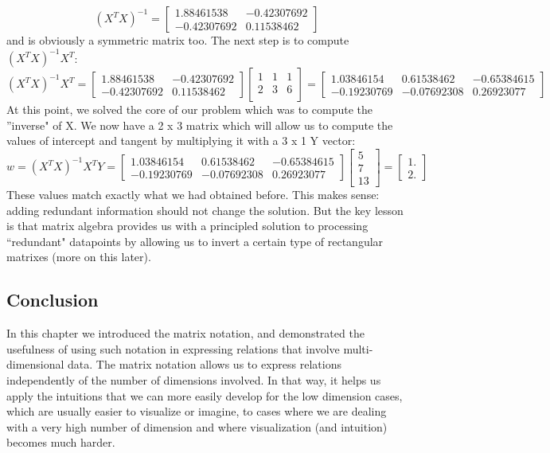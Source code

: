 \begin{equation}
(X^T X)^{-1}=
\begin{bmatrix}
1.88461538 & -0.42307692\\
-0.42307692 &  0.11538462
\end{bmatrix}
\end{equation}
and is obviously a symmetric matrix too. The next step is to compute $(X^T X)^{-1} X^T$:
\begin{equation}
(X^T X)^{-1} X^T=
\begin{bmatrix}
1.88461538 & -0.42307692\\
-0.42307692 &  0.11538462
\end{bmatrix}
\begin{bmatrix}
1& 1 &1\\
2& 3 &6\\
\end{bmatrix}=
\begin{bmatrix}
1.03846154 &  0.61538462 & -0.65384615\\
-0.19230769 & -0.07692308 &  0.26923077
\end{bmatrix}
\end{equation}
At this point, we solved the core of our problem which was to compute the ''inverse" of X. We now have a 2 x 3 matrix which will allow us to compute the values of intercept and tangent by multiplying it with a 3 x 1 Y vector:
\begin{equation}
w = (X^T X)^{-1} X^T Y=
\begin{bmatrix}
1.03846154 &  0.61538462 & -0.65384615\\
-0.19230769 & -0.07692308 &  0.26923077
\end{bmatrix}
\begin{bmatrix}
5\\
7\\
13
\end{bmatrix}
= 
\begin{bmatrix}
1.\\ 
2.
\end{bmatrix}
\end{equation}
These values match exactly what we had obtained before. This makes sense: adding redundant information should not change the solution. But the key lesson is that matrix algebra provides us with a principled solution to processing ``redundant" datapoints by allowing us to invert a certain type of rectangular matrixes (more on this later).

\subsection{Conclusion}
In this chapter we introduced the matrix notation, and demonstrated the usefulness of using such notation in expressing relations that involve multi-dimensional data. The matrix notation allows us to express relations independently of the number of dimensions involved. In that way, it helps us apply the intuitions that we can more easily develop for the low dimension cases, which are usually easier to visualize or imagine, to cases where we are dealing with a very high number of dimension and where visualization (and intuition) becomes much harder.

